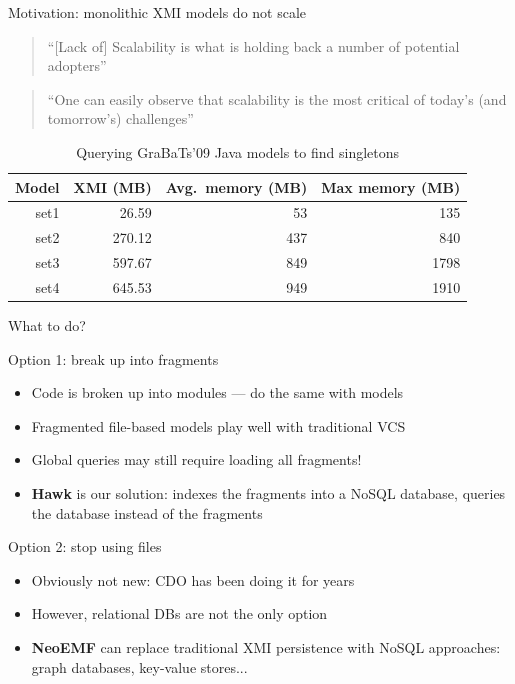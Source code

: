 \begin{frame}{Motivation: monolithic XMI models do not scale}
\centering

\begin{quote}
``[Lack of] Scalability is what is holding back a number of potential adopters''~\cite{Barmpis2013}
\end{quote}

\begin{quote}
``One can easily observe that scalability is the most critical of today's (and tomorrow's) challenges''~\cite{Mougenot2009}
\end{quote}

\begin{table}
\begin{tabular}{rrrr}
\toprule
Model & XMI (MB) & Avg.\ memory (MB) & Max memory (MB) \\
\midrule
set1 & 26.59 & 53 & 135 \\
set2 & 270.12 & 437 & 840 \\
set3 & 597.67 & 849 & 1798 \\
set4 & 645.53 & 949 & 1910 \\
\bottomrule
\end{tabular}

\caption{Querying GraBaTs'09 Java models to find singletons}
\end{table}

\end{frame}

\begin{frame}{What to do?}

\begin{block}{Option 1: break up into fragments}
  \begin{itemize}
  \item Code is broken up into modules --- do the same with models
  \item Fragmented file-based models play well with traditional VCS
  \item Global queries may still require loading all fragments!
  \item \textbf{\alert{Hawk}} is our solution: indexes the fragments into a NoSQL database, queries the database instead of the fragments
  \end{itemize}
\end{block}

\begin{block}{Option 2: stop using files}
  \begin{itemize}
  \item Obviously not new: CDO has been doing it for years
  \item However, relational DBs are not the only option
  \item \textbf{\alert{NeoEMF}} can replace traditional XMI persistence with
    NoSQL approaches: graph databases, key-value stores...
  \end{itemize}
\end{block}

\end{frame}

